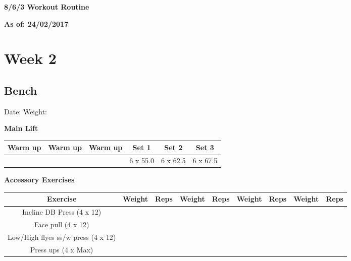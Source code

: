\documentclass{article}%
\begin{document}
%
\normalsize%
\pagestyle{header}%
\linebreak%
\begin{Large}%
\textbf{8/6/3 Workout Routine}%
\end{Large}%
\linebreak%
\begin{large}%
\textbf{As of: 24/02/2017}%
\end{large}%
\linebreak%
\section*{Week 2}%
\subsection*{Bench}%
Date: %
\linebreak%
Weight: %
\vspace*{20pt}%
\linebreak%
\begin{minipage}{0.5\textwidth}%
\textbf{Main Lift\newline%
\newline%
}%
\begin{tabular}{|c|c|c|c|c|c|}%
\hline%
Warm up&Warm up&Warm up&Set 1&Set 2&Set 3\\%
\hline%
&&&6 x 55.0&6 x 62.5&6 x 67.5\\%
\hline%
\end{tabular}%
\vspace*{20pt}%
\linebreak%
\textbf{Accessory Exercises\newline%
\newline%
}%
\begin{tabular}{|c|c|c|c|c|c|c|c|c|}%
\hline%
Exercise&Weight&Reps&Weight&Reps&Weight&Reps&Weight&Reps\\%
\hline%
Incline DB Press (4 x 12)&&&&&&&&\\%
\hline%
Face pull (4 x 12)&&&&&&&&\\%
\hline%
Low/High flyes ss/w press (4 x 12)&&&&&&&&\\%
\hline%
Press ups (4 x Max)&&&&&&&&\\%
\hline%
\end{tabular}%
\end{minipage}%
\vspace*{20pt}%
\linebreak

%
\end{document}
